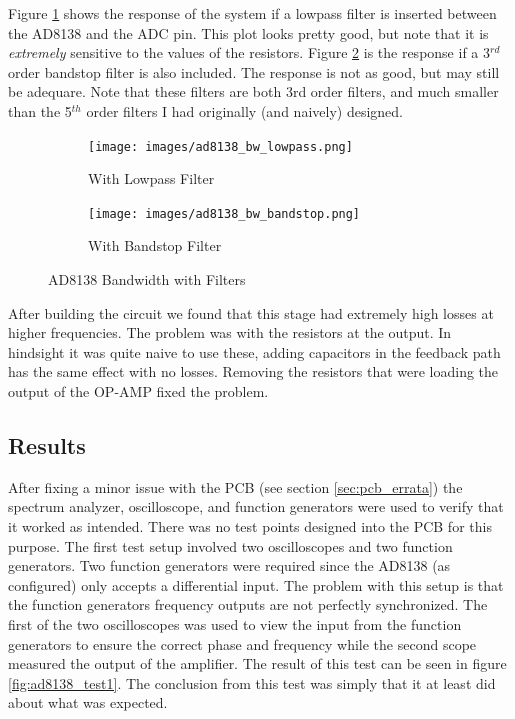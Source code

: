 \documentclass[a4paper, 12pt, notitlepage]{article}
\begin{document}
Figure \ref{fig:ad8138_bw_lowpass} shows the response of the system if a lowpass filter is inserted between the AD8138 and the ADC pin.  This plot looks pretty good, but note that it is \textit{extremely} sensitive to the values of the resistors.  Figure \ref{fig:ad8138_bw_bandstop} is the response if a 3$^{rd}$ order bandstop filter is also included.  The response is not as good, but may still be adequare.  Note that these filters are both 3rd order filters, and much smaller than the 5$^{th}$ order filters I had originally (and naively) designed.

\begin{figure}[ht]
\centering
\begin{subfigure}[b]{0.45\textwidth}
  \texttt{[image: images/ad8138\_bw\_lowpass.png]}
  \caption{With Lowpass Filter}
  \label{fig:ad8138_bw_lowpass}
\end{subfigure}
\begin{subfigure}[b]{0.45\textwidth}
  \texttt{[image: images/ad8138\_bw\_bandstop.png]}
  \caption{With Bandstop Filter}
  \label{fig:ad8138_bw_bandstop}
\end{subfigure}

\caption{AD8138 Bandwidth with Filters}
\label{fig:ad8138_bw_filters}
\end{figure}

After building the circuit we found that this stage had extremely high losses at higher frequencies.  The problem was with the resistors at the output.  In hindsight it was quite naive to use these, adding capacitors in the feedback path has the same effect with no losses.  Removing the resistors that were loading the output of the OP-AMP fixed the problem.

\subsection{Results}
After fixing a minor issue with the PCB (see section \ref{sec:pcb_errata}) the spectrum analyzer, oscilloscope, and function generators were used to verify that it worked as intended.  There was no test points designed into the PCB for this purpose.  The first test setup involved two oscilloscopes and two function generators.  Two function generators were required since the AD8138 (as configured) only accepts a differential input.  The problem with this setup is that the function generators frequency outputs are not perfectly synchronized.  The first of the two oscilloscopes was used to view the input from the function generators to ensure the correct phase and frequency while the second scope measured the output of the amplifier.  The result of this test can be seen in figure \ref{fig:ad8138_test1}.  The conclusion from this test was simply that it at least did about what was expected.
\end{document}
